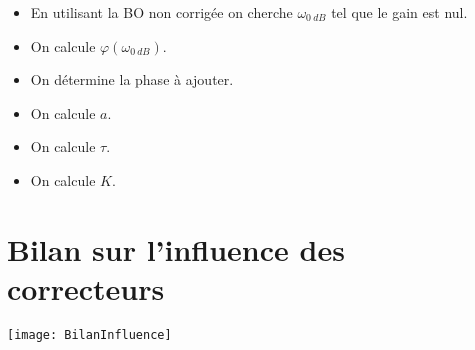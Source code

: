\begin{methode}
\begin{itemize}
\item En utilisant la BO non corrigée on cherche $\omega_{\SI{0}{dB}}$ tel que le gain est nul.
\item On calcule $\varphi\left(\omega_{\SI{0}{dB}}\right)$. 
\item On détermine la phase à ajouter. 
\item On calcule $a$. 
\item On calcule $\tau$.
\item On calcule $K$. 
\end{itemize}


\end{methode}


\section{Bilan sur l'influence des correcteurs}
\begin{center}
\texttt{[image: BilanInfluence]}
\end{center}

